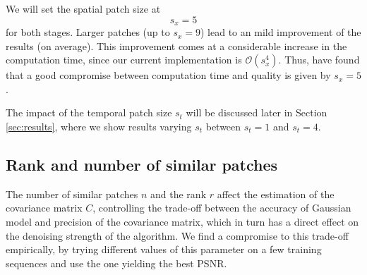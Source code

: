 \documentclass[10pt, journal, twocolumn, final, a4paper]{IEEEtran}
\newcommand{\pa}[1]{\textcolor{cyan}{#1}}
\newcommand{\prm}[1]{\pa{\sout{#1}}}
\newcommand{\pcomment}[1]{\textit{\pa{#1}}}
\begin{document}
We will set the spatial patch size at \[s_x = 5\] for both stages. Larger
patches (up to $s_x = 9$) lead to an mild improvement of the results (on
average). This improvement comes at a considerable increase in the
computation time, since our current implementation is $\mathcal O(s_x^4)$. Thus,
have found that a good compromise between computation time and quality is given
by $s_x = 5$.

The impact of the temporal patch size $s_t$ will be discussed later in Section
\ref{sec:results}, where we show results varying $s_t$ between $s_t = 1$ and $s_t = 4$.

\subsection{Rank and number of similar patches}

The number of similar patches $n$ and the rank $r$ affect the estimation of the covariance
matrix $C$, controlling the trade-off between the accuracy of Gaussian model
and precision of the covariance matrix,
which in turn has a direct effect on the denoising strength of the algorithm.
We find a compromise to this trade-off empirically, by trying different values of this parameter on a 
few training sequences and use the one yielding the best PSNR.



\end{document}
